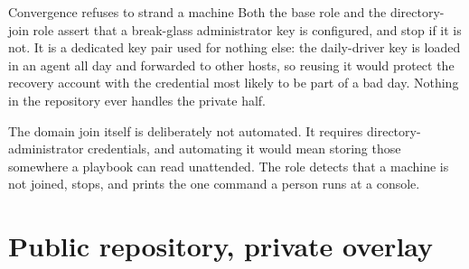 \begin{gate}{Convergence refuses to strand a machine}
Both the base role and the directory-join role assert that a break-glass
administrator key is configured, and stop if it is not. It is a dedicated key
pair used for nothing else: the daily-driver key is loaded in an agent all day
and forwarded to other hosts, so reusing it would protect the recovery account
with the credential most likely to be part of a bad day. Nothing in the
repository ever handles the private half. 
\end{gate}

The domain join itself is deliberately not automated. It requires
directory-administrator credentials, and automating it would mean storing those
somewhere a playbook can read unattended. The role detects that a machine is not
joined, stops, and prints the one command a person runs at a console.

\section{Public repository, private overlay}
\begin{telosfacts}[0.24]
\end{telosfacts}

